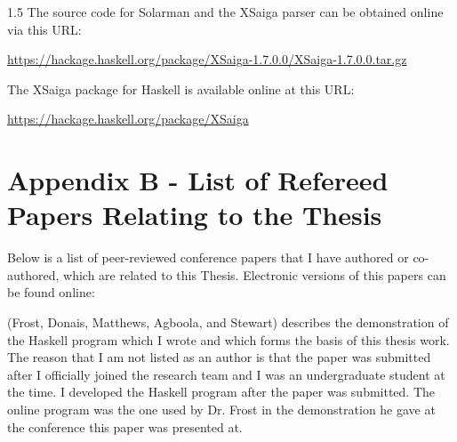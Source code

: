 \documentclass[fleqn, oneside, 12pt]{book}
\theoremstyle{definitionsty}
\newcommand{\uwinonehalfspacelen}{1.5}
\newcommand{\uwindefaultspacelen}{\uwinonehalfspacelen}
\newenvironment{uwindefaultspaceenv}%
{\begin{spacing}{\uwindefaultspacelen}}%
	{\end{spacing}}
\begin{document}
\begin{uwindefaultspaceenv}
The source code for Solarman and the XSaiga parser can be obtained online via this URL:

{\noindent \small \url{https://hackage.haskell.org/package/XSaiga-1.7.0.0/XSaiga-1.7.0.0.tar.gz}}

\noindent The XSaiga package for Haskell is available online at this URL:

{\noindent \small \url{https://hackage.haskell.org/package/XSaiga}}

\section*{Appendix B - List of Refereed Papers Relating to the Thesis}
\label{appendix:b}

Below is a list of peer-reviewed conference papers that I have authored or co-authored, which are related to this Thesis.  Electronic versions of this papers can be found online: %

\cite{donais2013system} 

\cite{peelar2017windsor} 

\cite{peelar2018toolpath} 

\cite{frost2018extensible} 

\cite{frostpeelar2019} 

\cite{peelar2020compositional} 

\cite{peelarfrostwebist2020} 

\cite{frost2014demonstration} 

\cite{frost2014demonstration} (Frost, Donais, Matthews, Agboola, and Stewart) describes the demonstration of the Haskell program which I wrote and which forms the basis of this thesis work.  The reason that I am not listed as an author is that the paper was submitted after I officially joined the research team and I was an undergraduate student at the time.  I developed the Haskell program after the paper was submitted.  The online program was the one used by Dr. Frost in the demonstration he gave at the conference this paper was presented at.


\end{uwindefaultspaceenv}
\end{document}
